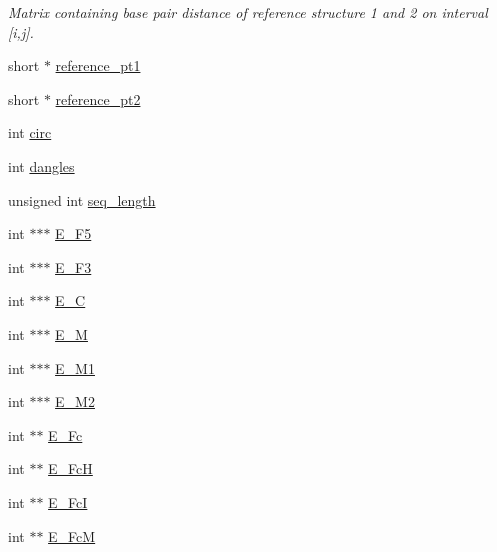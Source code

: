\begin{DoxyCompactItemize}
\begin{DoxyCompactList}\small\item\em Matrix containing base pair distance of reference structure 1 and 2 on interval \mbox{[}i,j\mbox{]}. \end{DoxyCompactList}\item 
short $\ast$ \mbox{\hyperlink{group__kl__neighborhood__mfe_ac3d9b7ee368f1cd0be1bd06dbfb8afe7}{reference\+\_\+pt1}}
\item 
short $\ast$ \mbox{\hyperlink{group__kl__neighborhood__mfe_a1cfef43ced426d71c2c4ffe32e82343b}{reference\+\_\+pt2}}
\item 
int \mbox{\hyperlink{group__kl__neighborhood__mfe_ae3a4308de89bdaa394375718c894c977}{circ}}
\item 
int \mbox{\hyperlink{group__kl__neighborhood__mfe_a2344e233bfc046e7261d8c5bea534153}{dangles}}
\item 
unsigned int \mbox{\hyperlink{group__kl__neighborhood__mfe_a4016860ccba7e21fdccd500446731696}{seq\+\_\+length}}
\item 
int $\ast$$\ast$$\ast$ \mbox{\hyperlink{group__kl__neighborhood__mfe_a0962f20b286965412ded96cf24db8024}{E\+\_\+\+F5}}
\item 
int $\ast$$\ast$$\ast$ \mbox{\hyperlink{group__kl__neighborhood__mfe_a11b9d64797932fc1994b5b0064f13468}{E\+\_\+\+F3}}
\item 
int $\ast$$\ast$$\ast$ \mbox{\hyperlink{group__kl__neighborhood__mfe_a93d2182608ed62830adfc456b0ce5681}{E\+\_\+C}}
\item 
int $\ast$$\ast$$\ast$ \mbox{\hyperlink{group__kl__neighborhood__mfe_aa6964c9af06773c3026a0f5d682f9fd8}{E\+\_\+M}}
\item 
int $\ast$$\ast$$\ast$ \mbox{\hyperlink{group__kl__neighborhood__mfe_af52b99762db1c3bf20a3284c5f3ed6c3}{E\+\_\+\+M1}}
\item 
int $\ast$$\ast$$\ast$ \mbox{\hyperlink{group__kl__neighborhood__mfe_a6a5669cfcd3565d339f57a125dcb5e06}{E\+\_\+\+M2}}
\item 
int $\ast$$\ast$ \mbox{\hyperlink{group__kl__neighborhood__mfe_a4eb4d9478bceacf9ad8bd38e41c943f9}{E\+\_\+\+Fc}}
\item 
int $\ast$$\ast$ \mbox{\hyperlink{group__kl__neighborhood__mfe_a8becf4cbe447676dd299b2232337cd3e}{E\+\_\+\+FcH}}
\item 
int $\ast$$\ast$ \mbox{\hyperlink{group__kl__neighborhood__mfe_abaf57df415bd53e0189d4430c59eb22c}{E\+\_\+\+FcI}}
\item 
int $\ast$$\ast$ \mbox{\hyperlink{group__kl__neighborhood__mfe_aa64e1390f197b238f49c6ffb37992eb2}{E\+\_\+\+FcM}}

\end{DoxyCompactItemize}
